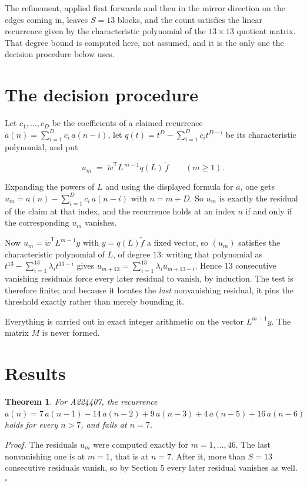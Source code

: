 \documentclass[11pt]{article}
\newtheorem{theorem}{Theorem}
\theoremstyle{definition}
\begin{document}
The refinement, applied first forwards and then in the mirror direction on the edges coming in, leaves $S = 13$ blocks, and the count satisfies the linear recurrence given by the characteristic polynomial of the $13 \times 13$ quotient matrix. That degree bound is computed here, not assumed, and it is the only one the decision procedure below uses.

\section{The decision procedure}

Let $c_1,\dots,c_D$ be the coefficients of a claimed recurrence $a(n) = \sum_{i=1}^{D} c_i\,a(n-i)$, let $q(t) = t^{D} - \sum_{i=1}^{D} c_i t^{D-i}$ be its characteristic polynomial, and put

\[u_m \;=\; \tilde w^{\mathsf T} L^{\,m-1} q(L)\,\tilde f \qquad (m \ge 1).\]

Expanding the powers of $L$ and using the displayed formula for $a$, one gets $u_m = a(n) - \sum_{i=1}^{D} c_i\,a(n-i)$ with $n = m + D$. So $u_m$ is exactly the residual of the claim at that index, and the recurrence holds at an index $n$ if and only if the corresponding $u_m$ vanishes.

Now $u_m = \tilde w^{\mathsf T} L^{m-1} y$ with $y = q(L)\tilde f$ a fixed vector, so $(u_m)$ satisfies the characteristic polynomial of $L$, of degree $13$: writing that polynomial as $t^{13} - \sum_{i=1}^{13} \lambda_i t^{13-i}$ gives $u_{m+13} = \sum_{i=1}^{13} \lambda_i u_{m+13-i}$. Hence $13$ consecutive vanishing residuals force every later residual to vanish, by induction. The test is therefore finite; and because it locates the {\itshape last} nonvanishing residual, it pins the threshold exactly rather than merely bounding it.

Everything is carried out in exact integer arithmetic on the vector $L^{m-1}y$. The matrix $M$ is never formed.

\section{Results}

\begin{theorem} For A224407, the recurrence $a(n) = 7\,a(n-1) - 14\,a(n-2) + 9\,a(n-3) + 4\,a(n-5) + 16\,a(n-6)$ holds for every $n > 7$, and fails at $n = 7$.\end{theorem}

{\itshape Proof.} The residuals $u_m$ were computed exactly for $m = 1,\dots,46$. The last nonvanishing one is at $m = 1$, that is at $n = 7$. After it, more than $S = 13$ consecutive residuals vanish, so by Section 5 every later residual vanishes as well. $\square$
\end{document}

